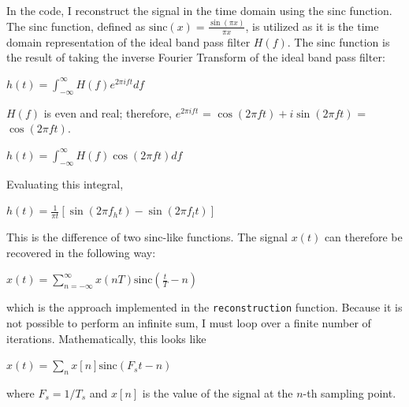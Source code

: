 \documentclass{article}
\begin{document}
In the code, I reconstruct the signal in the time domain using the sinc function.
The sinc function, defined as $\text{sinc}(x) = \frac{\sin(\pi x)}{\pi x}$, is utilized as it is the time domain representation of the ideal band pass filter $H(f)$.
The sinc function is the result of taking the inverse Fourier Transform of the ideal band pass filter:
\begin{center}
    \begin{math}
        h(t) = \displaystyle \int_{-\infty}^{\infty} H(f) e^{2\pi i ft} df
    \end{math}  
\end{center}
$H(f)$ is even and real; therefore, $e^{2\pi i ft}$ = $\cos(2\pi ft) + i \sin(2\pi ft)$ = $\cos(2\pi ft)$.
\begin{center}
    \begin{math}
        h(t) = \displaystyle \int_{-\infty}^{\infty} H(f) \cos(2\pi ft) df
    \end{math}  
\end{center}
Evaluating this integral,
\begin{center}
    \begin{math}
        h(t) = \frac{1}{\pi t} \left[ \sin(2\pi f_h t) - \sin(2\pi f_l t) \right]
    \end{math}  
\end{center}
This is the difference of two sinc-like functions. 
The signal $x(t)$ can therefore be recovered in the following way:
\begin{center}
    \begin{math}
        x(t) = \displaystyle\sum_{n=-\infty}^{\infty} x(nT) \text{sinc}\left( \frac{t}{T} - n \right)
    \end{math}  
\end{center}
which is the approach implemented in the \verb|reconstruction| function. Because it is not possible to perform an infinite sum, I must loop over a finite number of iterations. Mathematically, this looks like
\begin{center}
    \begin{math}
        x(t) = \displaystyle\sum_{n}^{} x[n] \text{sinc}\left( F_st - n \right)
    \end{math}  
\end{center}
where $F_s = 1/T_s$ and $x[n]$ is the value of the signal at the $n$-th sampling point.
\end{document}
